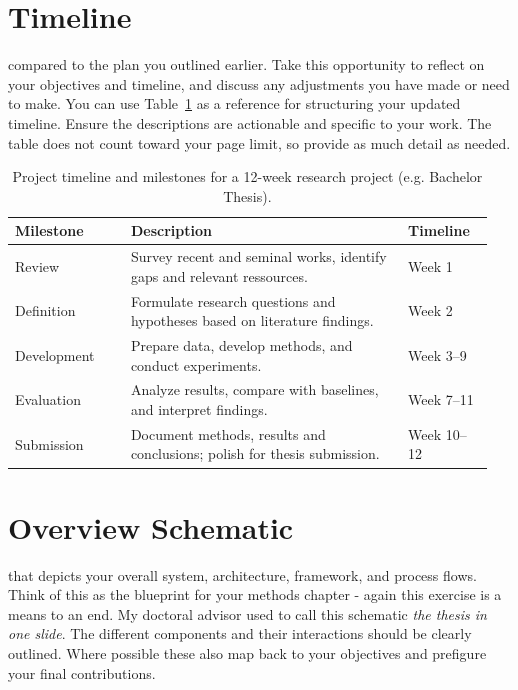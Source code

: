 
\bigskip
\section{Timeline}
 compared to the plan you outlined earlier.
Take this opportunity to reflect on your objectives and timeline, and discuss any adjustments you have made or need to make.
You can use Table~\ref{tab:timeline} as a reference for structuring your updated timeline. Ensure the descriptions are actionable and specific to your work. 
The table does not count toward your page limit, so provide as much detail as needed.

\begin{table}[ht]
  \centering
  \begin{tabular}{p{0.23\linewidth} p{0.55\linewidth} p{0.17\linewidth}}
    \toprule
    \textbf{Milestone} & \textbf{Description} & \textbf{Timeline} \\
    \midrule
    Review & Survey recent and seminal works, identify gaps and relevant ressources. & Week 1 \\
    Definition & Formulate research questions and hypotheses based on literature findings. & Week 2 \\
    Development & Prepare data, develop methods, and conduct experiments. & Week 3--9 \\
    Evaluation & Analyze results, compare with baselines, and interpret findings. & Week 7--11 \\
    Submission & Document methods, results and conclusions; polish for thesis submission. & Week 10--12 \\
    \bottomrule
  \end{tabular}
  \caption{Project timeline and milestones for a 12-week research project (e.g. Bachelor Thesis).}
  \label{tab:timeline}
\end{table}



\section{Overview Schematic}

 that depicts your overall system, architecture, framework, and process flows.
Think of this as the blueprint for your methods chapter - again this exercise is a means to an end. 
My doctoral advisor used to call this schematic \textit{the thesis in one slide}.
The different components and their interactions should be clearly outlined. Where possible these also map back to your objectives and prefigure your final contributions. 

